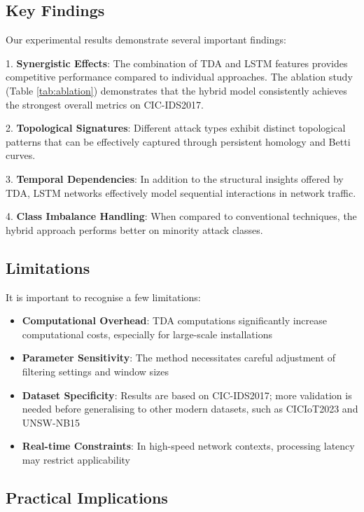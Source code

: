\documentclass[conference]{IEEEtran}
\begin{document}
\subsection{Key Findings}

Our experimental results demonstrate several important findings:

1. \textbf{Synergistic Effects}: The combination of TDA and LSTM features provides competitive performance compared to individual approaches. The ablation study (Table \ref{tab:ablation}) demonstrates that the hybrid model consistently achieves the strongest overall metrics on CIC-IDS2017.

2. \textbf{Topological Signatures}: Different attack types exhibit distinct topological patterns that can be effectively captured through persistent homology and Betti curves.

3. \textbf{Temporal Dependencies}: In addition to the structural insights offered by TDA, LSTM networks effectively model sequential interactions in network traffic.

4. \textbf{Class Imbalance Handling}: When compared to conventional techniques, the hybrid approach performs better on minority attack classes.

\subsection{Limitations}

It is important to recognise a few limitations:

\begin{itemize}
\item \textbf{Computational Overhead}: TDA computations significantly increase computational costs, especially for large-scale installations
\item \textbf{Parameter Sensitivity}: The method necessitates careful adjustment of filtering settings and window sizes
\item \textbf{Dataset Specificity}: Results are based on CIC-IDS2017; more validation is needed before generalising to other modern datasets, such as CICIoT2023 and UNSW-NB15
\item \textbf{Real-time Constraints}: In high-speed network contexts, processing latency may restrict applicability
\end{itemize}

\subsection{Practical Implications}
\end{document}
